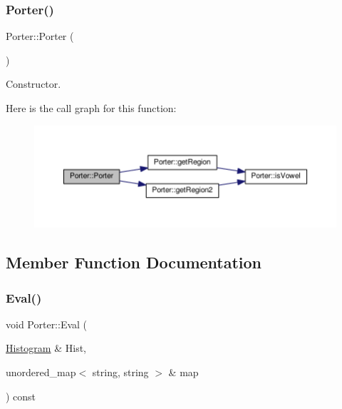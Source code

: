 \subsubsection{\texorpdfstring{Porter()}{Porter()}}
{\footnotesize\ttfamily Porter\+::\+Porter (\begin{DoxyParamCaption}{ }\end{DoxyParamCaption})\hspace{0.3cm}{\ttfamily [inline]}}



Constructor. 

Here is the call graph for this function\+:
\nopagebreak
\begin{figure}[H]
\begin{center}
\leavevmode
\includegraphics[width=350pt]{class_porter_a04be3733ab5109a1cf6131de05cc5961_cgraph}
\end{center}
\end{figure}


\subsection{Member Function Documentation}
\mbox{\label{class_porter_afbe6ae10a924a4419e62a20babe3be7d}} 
\subsubsection{\texorpdfstring{Eval()}{Eval()}}
{\footnotesize\ttfamily void Porter\+::\+Eval (\begin{DoxyParamCaption}\item[{\hyperlink{class_histogram}{Histogram} \&}]{Hist,  }\item[{unordered\+\_\+map$<$ string, string $>$ \&}]{map }\end{DoxyParamCaption}) const}

